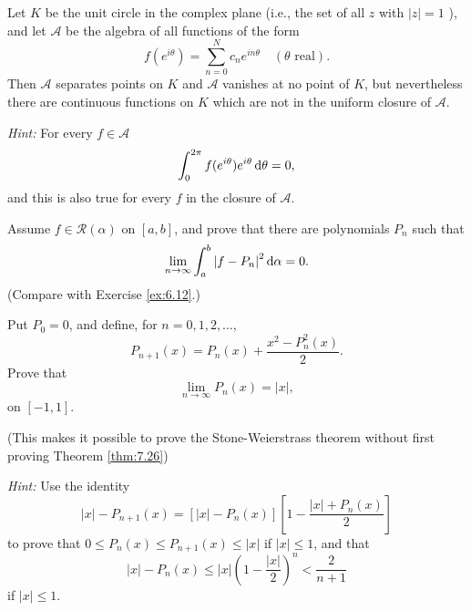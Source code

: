 \begin{myExercise}
    \label{ex:7.21}
    Let $K$ be the unit circle in the complex plane 
    (i.e., the set of all $z$ with $| z | = 1$ ), 
    and let $\mathscr{A}$ be the algebra of all functions of the form
    \begin{equation*}
        f(e^{i \theta}) = \sum_{n=0}^{N} c_n e^{i n \theta} \quad 
        (\theta \text{ real}).
    \end{equation*}
    Then $\mathscr{A}$ separates points on $K$ and $\mathscr{A}$ vanishes at no point of $K$, but nevertheless there are continuous functions on $K$ which are not in the uniform closure of $\mathscr{A}$. 

    \emph{Hint:} For every $f \in \mathscr{A}$
    \begin{equation*}
        \int_{0}^{2\pi} f(e^{i\theta})e^{i\theta} \d \theta = 0 ,
    \end{equation*}
    and this is also true for every $f$ in the closure of $\mathscr{A}$.
\end{myExercise}


\begin{myExercise}
    \label{ex:7.22}
    Assume $f \in \mathscr{R}(\alpha)$ on $[a, b]$, and prove that there are polynomials $P_n$ such that
    \begin{equation*}
        \lim_{n \to \infty} \int_{a}^{b} \left| f - P_n \right|^2 \d \alpha = 0 . 
    \end{equation*}
    (Compare with Exercise \ref{ex:6.12}.)
\end{myExercise}


\begin{myExercise}
    \label{ex:7.23}
    Put $P_0 = 0$, and define, for $n=0,1,2,\dots$,
    \begin{equation*}
        P_{n+1}(x) = P_n(x) + \frac{x^2 - P_n^2(x)}{2}.
    \end{equation*}
    Prove that 
    \begin{equation*}
        \lim_{n \to \infty} P_n(x) = \left| x \right| ,
    \end{equation*}
     on $[-1,1]$.

    (This makes it possible to prove the Stone-Weierstrass theorem without first proving Theorem \ref{thm:7.26})

    \emph{Hint:} Use the identity 
    \begin{equation*}
        |x| - P_{n+1}(x) = \left[ |x| - P_n(x) \right]\left[ 1-\frac{|x|+P_n(x)}{2} \right]
    \end{equation*}
    to prove that $0 \leq P_n(x) \leq P_{n+1}(x) \leq |x|$ if $|x| \leq 1$, and that 
    \begin{equation*}
        |x| - P_n(x) \leq |x| \left( 1-\frac{|x|}{2} \right)^n < \frac{2}{n+1}
    \end{equation*}
    if $|x| \leq 1$.
\end{myExercise}


